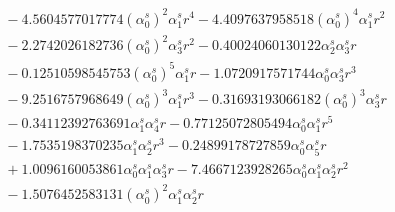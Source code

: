 \documentclass[10pt]{article}
\begin{document}
\begin{align*}
&{}  - 4.5604577017774 \left(\alpha_{0}^s\right)^{2} \alpha_{1}^s r^{4} - 4.4097637958518 \left(\alpha_{0}^s\right)^{4} \alpha_{1}^s r^{2} \\
&{}  - 2.2742026182736 \left(\alpha_{0}^s\right)^{2} \alpha_{3}^s r^{2} - 0.40024060130122 \alpha_{2}^s \alpha_{3}^s r \\
&{}  - 0.12510598545753 \left(\alpha_{0}^s\right)^{5} \alpha_{1}^s r - 1.0720917571744 \alpha_{0}^s \alpha_{3}^s r^{3} \\
&{}  - 9.2516757968649 \left(\alpha_{0}^s\right)^{3} \alpha_{1}^s r^{3} - 0.31693193066182 \left(\alpha_{0}^s\right)^{3} \alpha_{3}^s r \\
&{}  - 0.34112392763691 \alpha_{1}^s \alpha_{4}^s r - 0.77125072805494 \alpha_{0}^s \alpha_{1}^s r^{5} \\
&{}  - 1.7535198370235 \alpha_{1}^s \alpha_{2}^s r^{3} - 0.24899178727859 \alpha_{0}^s \alpha_{5}^s r \\
&{}  + 1.0096160053861 \alpha_{0}^s \alpha_{1}^s \alpha_{3}^s r - 7.4667123928265 \alpha_{0}^s \alpha_{1}^s \alpha_{2}^s r^{2} \\
&{}  - 1.5076452583131 \left(\alpha_{0}^s\right)^{2} \alpha_{1}^s \alpha_{2}^s r
\end{align*}
\end{document}
